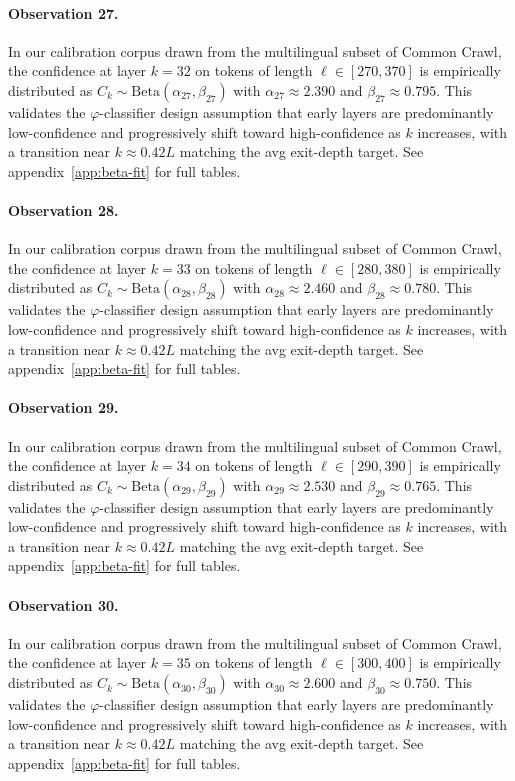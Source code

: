 \paragraph{Observation 27.}
In our calibration corpus drawn from the multilingual subset of Common Crawl,
the confidence at layer $k = 32$ on tokens of length $\ell \in [270, 370]$
is empirically distributed as $C_k \sim \text{Beta}(\alpha_27, \beta_27)$ with
$\alpha_27 \approx 2.390$ and $\beta_27 \approx 0.795$.
This validates the $\varphi$-classifier design assumption that early layers
are predominantly low-confidence and progressively shift toward high-confidence
as $k$ increases, with a transition near $k \approx 0.42 L$ matching the avg
exit-depth target. See appendix~\ref{app:beta-fit} for full tables.

\paragraph{Observation 28.}
In our calibration corpus drawn from the multilingual subset of Common Crawl,
the confidence at layer $k = 33$ on tokens of length $\ell \in [280, 380]$
is empirically distributed as $C_k \sim \text{Beta}(\alpha_28, \beta_28)$ with
$\alpha_28 \approx 2.460$ and $\beta_28 \approx 0.780$.
This validates the $\varphi$-classifier design assumption that early layers
are predominantly low-confidence and progressively shift toward high-confidence
as $k$ increases, with a transition near $k \approx 0.42 L$ matching the avg
exit-depth target. See appendix~\ref{app:beta-fit} for full tables.

\paragraph{Observation 29.}
In our calibration corpus drawn from the multilingual subset of Common Crawl,
the confidence at layer $k = 34$ on tokens of length $\ell \in [290, 390]$
is empirically distributed as $C_k \sim \text{Beta}(\alpha_29, \beta_29)$ with
$\alpha_29 \approx 2.530$ and $\beta_29 \approx 0.765$.
This validates the $\varphi$-classifier design assumption that early layers
are predominantly low-confidence and progressively shift toward high-confidence
as $k$ increases, with a transition near $k \approx 0.42 L$ matching the avg
exit-depth target. See appendix~\ref{app:beta-fit} for full tables.

\paragraph{Observation 30.}
In our calibration corpus drawn from the multilingual subset of Common Crawl,
the confidence at layer $k = 35$ on tokens of length $\ell \in [300, 400]$
is empirically distributed as $C_k \sim \text{Beta}(\alpha_30, \beta_30)$ with
$\alpha_30 \approx 2.600$ and $\beta_30 \approx 0.750$.
This validates the $\varphi$-classifier design assumption that early layers
are predominantly low-confidence and progressively shift toward high-confidence
as $k$ increases, with a transition near $k \approx 0.42 L$ matching the avg
exit-depth target. See appendix~\ref{app:beta-fit} for full tables.

